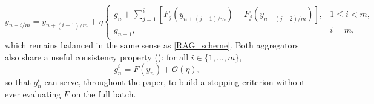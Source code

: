 \begin{equation}
	y_{n+i/m} = y_{n+(i-1)/m} + \eta
	\begin{cases}
		g_n+\displaystyle\sum_{j=1}^i \left[F_j\left(y_{n+(j-1)/m}\right)-F_j\left(y_{n+(j-2)/m}\right)\right], & 1\leq i<m,\\
		g_{n+1}, & i=m,
	\end{cases}
	\label{RAGL_splitting}
\end{equation}
which remains balanced in the same sense as \eqref{RAG_scheme}. Both aggregators also share a useful consistency property (\cite{partI}): for all $i\in\{1,\dots,m\}$,
\begin{equation}
	g_n^i = F(y_n) +\mathcal{O}(\eta),
	\label{stopping_criterion}
\end{equation}
so that $g_n^i$ can serve, throughout the paper, to build a stopping criterion without ever evaluating $F$ on the full batch.

